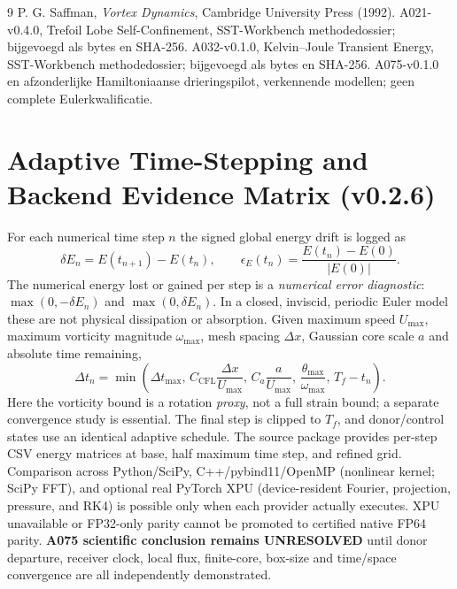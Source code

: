 \documentclass[10pt,a4paper]{article}
\begin{document}
\begin{thebibliography}{9}
 P. G. Saffman, \emph{Vortex Dynamics}, Cambridge University Press (1992).
 A021-v0.4.0, Trefoil Lobe Self-Confinement, SST-Workbench methodedossier; bijgevoegd als bytes en SHA-256.
 A032-v0.1.0, Kelvin--Joule Transient Energy, SST-Workbench methodedossier; bijgevoegd als bytes en SHA-256.
 A075-v0.1.0 en afzonderlijke Hamiltoniaanse drieringspilot, verkennende modellen; geen complete Eulerkwalificatie.
\end{thebibliography}

\section{Adaptive Time-Stepping and Backend Evidence Matrix (v0.2.6)}
For each numerical time step $n$ the signed global energy drift is logged as
\begin{equation}
\delta E_n=E(t_{n+1})-E(t_n),\qquad
\epsilon_E(t_n)=\frac{E(t_n)-E(0)}{|E(0)|}.
\end{equation}
The numerical energy lost or gained per step is a \emph{numerical error diagnostic}:
$\max(0,-\delta E_n)$ and $\max(0,\delta E_n)$. In a closed, inviscid,
periodic Euler model these are not physical dissipation or absorption.
Given maximum speed $U_{\max}$, maximum vorticity magnitude $\omega_{\max}$,
mesh spacing $\Delta x$, Gaussian core scale $a$ and absolute time remaining,
\begin{equation}
\Delta t_n=\min\left(\Delta t_{\max},\,
C_{\mathrm{CFL}}\frac{\Delta x}{U_{\max}},\,
C_a\frac{a}{U_{\max}},\,
\frac{\theta_{\max}}{\omega_{\max}},\,T_f-t_n\right).
\end{equation}
Here the vorticity bound is a rotation \emph{proxy}, not a full strain bound;
a separate convergence study is essential. The final step is clipped to $T_f$,
and donor/control states use an identical adaptive schedule.
The source package provides per-step CSV energy matrices at base,
half maximum time step, and refined grid. Comparison across Python/SciPy,
C++/pybind11/OpenMP (nonlinear kernel; SciPy FFT), and optional real
PyTorch XPU (device-resident Fourier, projection, pressure, and RK4) is
possible only when each provider actually executes. XPU unavailable or
FP32-only parity cannot be promoted to certified native FP64 parity.
\textbf{A075 scientific conclusion remains UNRESOLVED} until donor departure,
receiver clock, local flux, finite-core, box-size and time/space convergence
are all independently demonstrated.
\end{document}
